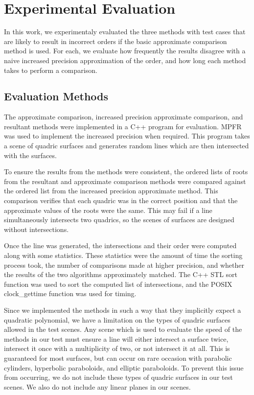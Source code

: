 \documentclass{cccg16}
\begin{document}
\section{Experimental Evaluation}
In this work, we experimentaly evaluated the three methods with test
cases that are likely to result in incorrect orders if the basic
approximate comparison method is used.  For each, we evaluate how
frequently the results disagree with a naive increased precision
approximation of the order, and how long each method takes to perform
a comparison.

\subsection{Evaluation Methods}
The approximate comparison, increased precision approximate
comparison, and resultant methods were implemented in a C++ program
for evaluation.  MPFR was used to implement the increased precision
when required.  This program takes a scene of quadric surfaces and
generates random lines which are then intersected with the surfaces.

To ensure the results from the methods were consistent, the ordered
lists of roots from the resultant and approximate comparison methods
were compared against the ordered list from the increased precision
approximate method.  This comparison verifies that each quadric was in
the correct position and that the approximate values of the roots were
the same.  This may fail if a line simultaneously intersects two
quadrics, so the scenes of surfaces are designed without
intersections.

Once the line was generated, the intersections and their order were
computed along with some statistics.  These statistics were the amount
of time the sorting process took, the number of comparisons made at
higher precision, and whether the results of the two algorithms
approximately matched.  The C++ STL sort function was used to sort the
computed list of intersections, and the POSIX clock\_gettime function
was used for timing.

Since we implemented the methods in such a way that they implicitly
expect a quadratic polynomial, we have a limitation on the types of
quadric surfaces allowed in the test scenes.  Any scene which is used
to evaluate the speed of the methods in our test must ensure a line
will either intersect a surface twice, intersect it once with a
multiplicity of two, or not intersect it at all.  This is guaranteed
for most surfaces, but can occur on rare occasion with parabolic
cylinders, hyperbolic paraboloids, and elliptic paraboloids.  To
prevent this issue from occurring, we do not include these types of
quadric surfaces in our test scenes.  We also do not include any
linear planes in our scenes.
\end{document}
